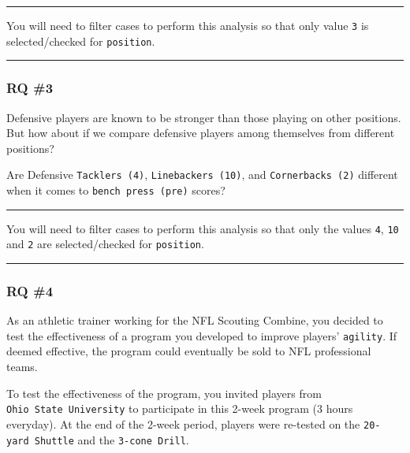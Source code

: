 \documentclass[
]{article}
\begin{document}
\begin{center}\rule{0.5\linewidth}{0.5pt}\end{center}

You will need to filter cases to perform this analysis so that only value \texttt{3} is selected/checked for \texttt{position}.

\begin{center}\rule{0.5\linewidth}{0.5pt}\end{center}

\hypertarget{rq-3}{%
\subsubsection{RQ \#3}\label{rq-3}}

Defensive players are known to be stronger than those playing on other positions. But how about if we compare defensive players among themselves from different positions?

Are Defensive \texttt{Tacklers\ (4)}, \texttt{Linebackers\ (10)}, and \texttt{Cornerbacks\ (2)} different when it comes to \texttt{bench\ press\ (pre)} scores?

\begin{center}\rule{0.5\linewidth}{0.5pt}\end{center}

You will need to filter cases to perform this analysis so that only the values \texttt{4}, \texttt{10} and \texttt{2} are selected/checked for \texttt{position}.

\begin{center}\rule{0.5\linewidth}{0.5pt}\end{center}

\hypertarget{rq-4}{%
\subsubsection{RQ \#4}\label{rq-4}}

As an athletic trainer working for the NFL Scouting Combine, you decided to test the effectiveness of a program you developed to improve players' \texttt{agility}. If deemed effective, the program could eventually be sold to NFL professional teams.

To test the effectiveness of the program, you invited players from \texttt{Ohio\ State\ University} to participate in this 2-week program (3 hours everyday). At the end of the 2-week period, players were re-tested on the \texttt{20-yard\ Shuttle} and the \texttt{3-cone\ Drill}.
\end{document}

